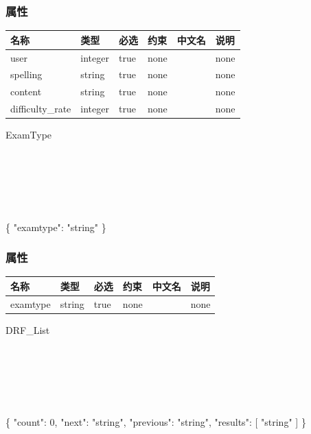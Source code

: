 \documentclass[
]{article}
\newenvironment{Shaded}{}{}
\newcommand{\DataTypeTok}[1]{\textcolor[rgb]{0.56,0.13,0.00}{#1}}
\newcommand{\DecValTok}[1]{\textcolor[rgb]{0.25,0.63,0.44}{#1}}
\newcommand{\FunctionTok}[1]{\textcolor[rgb]{0.02,0.16,0.49}{#1}}
\newcommand{\OtherTok}[1]{\textcolor[rgb]{0.00,0.44,0.13}{#1}}
\newcommand{\StringTok}[1]{\textcolor[rgb]{0.25,0.44,0.63}{#1}}
\begin{document}
\hypertarget{ux5c5eux6027-5}{%
\subsubsection{属性}\label{ux5c5eux6027-5}}

\begin{longtable}[]{@{}llllll@{}}
\toprule
名称 & 类型 & 必选 & 约束 & 中文名 & 说明 \\
\midrule
\endhead
user & integer & true & none & & none \\
spelling & string & true & none & & none \\
content & string & true & none & & none \\
difficulty\_rate & integer & true & none & & none \\
\bottomrule
\end{longtable}

ExamType

\strut \\
\strut \\
\strut \\

\begin{Shaded}
\begin{Highlighting}[]
\FunctionTok{\{}
  \DataTypeTok{"examtype"}\FunctionTok{:} \StringTok{"string"}
\FunctionTok{\}}
\end{Highlighting}
\end{Shaded}

\hypertarget{ux5c5eux6027-6}{%
\subsubsection{属性}\label{ux5c5eux6027-6}}

\begin{longtable}[]{@{}llllll@{}}
\toprule
名称 & 类型 & 必选 & 约束 & 中文名 & 说明 \\
\midrule
\endhead
examtype & string & true & none & & none \\
\bottomrule
\end{longtable}

DRF\_List

\strut \\
\strut \\
\strut \\

\begin{Shaded}
\begin{Highlighting}[]
\FunctionTok{\{}
  \DataTypeTok{"count"}\FunctionTok{:} \DecValTok{0}\FunctionTok{,}
  \DataTypeTok{"next"}\FunctionTok{:} \StringTok{"string"}\FunctionTok{,}
  \DataTypeTok{"previous"}\FunctionTok{:} \StringTok{"string"}\FunctionTok{,}
  \DataTypeTok{"results"}\FunctionTok{:} \OtherTok{[}
    \StringTok{"string"}
  \OtherTok{]}
\FunctionTok{\}}
\end{Highlighting}
\end{Shaded}
\end{document}
